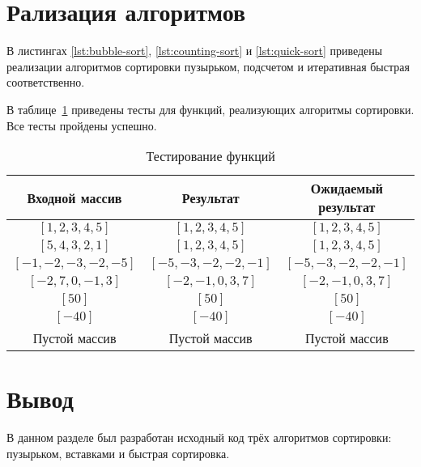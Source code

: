\section{Рализация алгоритмов}
В листингах \ref{lst:bubble-sort}, \ref{lst:counting-sort} и \ref{lst:quick-sort} приведены реализации алгоритмов
сортировки пузырьком, подсчетом и итеративная быстрая соответственно.

\newpage

\newpage


В таблице~\ref{tbl:test} приведены тесты для функций, реализующих алгоритмы сортировки.
Все тесты пройдены успешно.

\begin{table}[h!]
    \begin{center}
        \begin{threeparttable}
            \captionsetup{justification=raggedright,singlelinecheck=off}
            \caption{\label{tbl:test}Тестирование функций}
            \begin{tabular}{|c|c|c|}
                \hline
                Входной массив & Результат & Ожидаемый результат \\
                \hline
                $[1, 2, 3, 4, 5]$ & $[1, 2, 3, 4, 5]$  & $[1, 2, 3, 4, 5]$\\\hline
                $[5, 4, 3, 2, 1]$  & $[1, 2, 3, 4, 5]$ & $[1, 2, 3, 4, 5]$\\\hline
                $[-1, -2, -3, -2, -5]$  & $[-5, -3, -2, -2, -1]$  & $[-5, -3, -2, -2, -1]$\\\hline
                $[-2, 7, 0, -1, 3]$  & $[-2, -1, 0, 3, 7]$  & $[-2, -1, 0, 3, 7]$\\\hline
                $[50]$  & $[50]$  & $[50]$\\\hline
                $[-40]$  & $[-40]$  & $[-40]$\\\hline
                Пустой массив  & Пустой массив  & Пустой массив\\
                \hline
            \end{tabular}
        \end{threeparttable}
    \end{center}
\end{table}
\newpage
\section*{Вывод}

В данном разделе был разработан исходный код трёх алгоритмов сортировки: пузырьком, вставками и быстрая сортировка.

